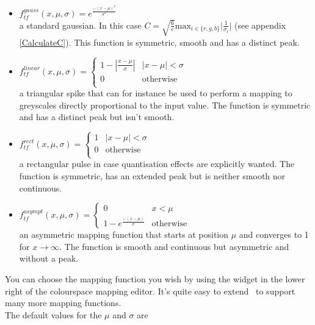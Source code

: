 \documentclass[11pt]{article}
\begin{document}
\begin{itemize}
\item
$f^{gauss}_{tf}(x, \mu, \sigma) = e^\frac{-(x - \mu)^2}{\sigma^2}$\\
a standard gaussian. In this case
$C = \sqrt{\frac{6}{e}} \mbox{max}_{i \in \{r,g,b\}} \vert \frac{1}{\sigma_i} \vert$
(see appendix \ref{CalculateC}). This function is symmetric, smooth and has a distinct
peak.

\item
$f^{linear}_{tf}(x, \mu, \sigma) = \left\lbrace \begin{array}{rl}
1 - \left|\frac{x - \mu}{\sigma} \right| & | x - \mu | < \sigma\\
0 & \mbox{otherwise}\\
\end{array} \right.$\\
a triangular spike that can for instance be used to perform
a mapping to greyscales directly proportional to the input value. The function
is symmetric and has a distinct peak but isn't smooth.

\item
$f^{rect}_{tf}(x, \mu, \sigma) = \left\lbrace \begin{array}{rl}
1 & | x - \mu | < \sigma\\
0 & \mbox{otherwise}\\
\end{array} \right.$\\
a rectangular pulse in case quantisation effects are
explicitly wanted. The function is symmetric, has an extended peak but is
neither smooth nor continuous.

\item
$f^{asympt}_{tf}(x, \mu, \sigma) = \left\lbrace \begin{array}{rl}
0 & x < \mu\\
1 - e^\frac{-(x - \mu)}{\sigma} & \mbox{otherwise}
\end{array} \right.$\\
an asymmetric mapping function that starts at position
$\mu$ and converges to 1 for $x \rightarrow \infty$. The function is smooth and
continuous but asymmetric and without a peak.

\end{itemize}

You can choose the mapping function you wish by using the widget in the lower right
of the colourspace mapping editor. It's quite easy to extend \rview\ to support
many more mapping functions.\\
The default values for the $\mu$ and $\sigma$ are
\end{document}
